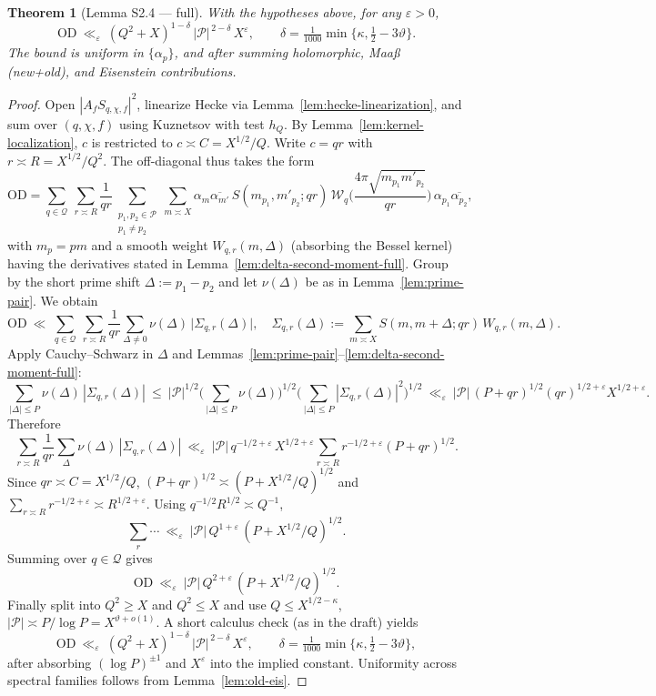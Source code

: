 \documentclass[11pt]{article}
\newtheorem{theorem}[lemma]{Theorem}
\theoremstyle{definition}
\theoremstyle{remark}
\begin{document}
\begin{theorem}[Lemma S2.4 — full]\label{lem:S2.4-full}
	With the hypotheses above, for any $\varepsilon>0$,
	\[
		\mathrm{OD}\ \ll_{\varepsilon}\ (Q^2+X)^{1-\delta}\,|\mathcal P|^{\,2-\delta}\,X^{\varepsilon},
		\qquad
		\delta=\tfrac1{1000}\min\{\kappa,\tfrac12-3\vartheta\}.
	\]
	The bound is uniform in $\{\alpha_p\}$, and after summing holomorphic, Maaß (new+old), and Eisenstein contributions.
\end{theorem}

\begin{proof}
	Open $|A_f S_{q,\chi,f}|^2$, linearize Hecke via Lemma~\ref{lem:hecke-linearization}, and sum over $(q,\chi,f)$ using Kuznetsov with test $h_Q$. By Lemma~\ref{lem:kernel-localization}, $c$ is restricted to $c\asymp C=X^{1/2}/Q$. Write $c=qr$ with $r\asymp R=X^{1/2}/Q^2$. The off-diagonal thus takes the form
	\[
		\mathrm{OD}
		=\sum_{q\in\mathcal Q}\ \sum_{r\asymp R}\frac{1}{qr}
		\sum_{\substack{p_1,p_2\in\mathcal P\\ p_1\ne p_2}}
		\sum_{m\asymp X}\!\alpha_m\overline{\alpha_{m'}}\,
		S(m_{p_1},m'_{p_2};qr)\,
		\mathcal W_q\!\Big(\frac{4\pi\sqrt{m_{p_1}m'_{p_2}}}{qr}\Big)\,\alpha_{p_1}\overline{\alpha_{p_2}},
	\]
	with $m_{p}=pm$ and a smooth weight $W_{q,r}(m,\Delta)$ (absorbing the Bessel kernel) having the derivatives stated in Lemma~\ref{lem:delta-second-moment-full}. Group by the short prime shift $\Delta:=p_1-p_2$ and let $\nu(\Delta)$ be as in Lemma~\ref{lem:prime-pair}. We obtain
	\[
		\mathrm{OD}
		\ \ll\ \sum_{q\in\mathcal Q}\ \sum_{r\asymp R}\frac{1}{qr}\sum_{\Delta\ne 0}\nu(\Delta)\,\big|\Sigma_{q,r}(\Delta)\big|,
		\quad
		\Sigma_{q,r}(\Delta):=\sum_{m\asymp X} S(m,m+\Delta;qr)\,W_{q,r}(m,\Delta).
	\]
	Apply Cauchy–Schwarz in $\Delta$ and Lemmas~\ref{lem:prime-pair}–\ref{lem:delta-second-moment-full}:
	\[
		\sum_{|\Delta|\le P}\nu(\Delta)\,|\Sigma_{q,r}(\Delta)|
		\ \le\ |\mathcal P|^{1/2}\Big(\sum_{|\Delta|\le P}\nu(\Delta)\Big)^{1/2}
		\Big(\sum_{|\Delta|\le P}|\Sigma_{q,r}(\Delta)|^2\Big)^{1/2}
		\ \ll_\varepsilon\ |\mathcal P|\,(P+qr)^{1/2}(qr)^{1/2+\varepsilon}X^{1/2+\varepsilon}.
	\]
	Therefore
	\[
		\sum_{r\asymp R}\frac{1}{qr}\sum_{\Delta}\nu(\Delta)\,|\Sigma_{q,r}(\Delta)|
		\ \ll_\varepsilon\ |\mathcal P|\,q^{-1/2+\varepsilon}\,X^{1/2+\varepsilon}\!
		\sum_{r\asymp R} r^{-1/2+\varepsilon}(P+qr)^{1/2}.
	\]
	Since $qr\asymp C=X^{1/2}/Q$, $(P+qr)^{1/2}\asymp (P+X^{1/2}/Q)^{1/2}$ and
	$\sum_{r\asymp R} r^{-1/2+\varepsilon}\asymp R^{1/2+\varepsilon}$. Using $q^{-1/2}R^{1/2}\asymp Q^{-1}$,
	\[
		\sum_{r}\cdots \ \ll_\varepsilon\ |\mathcal P|\,Q^{1+\varepsilon}\,(P+X^{1/2}/Q)^{1/2}.
	\]
	Summing over $q\in\mathcal Q$ gives
	\[
		\mathrm{OD}\ \ll_\varepsilon\ |\mathcal P|\,Q^{2+\varepsilon}\,(P+X^{1/2}/Q)^{1/2}.
	\]
	Finally split into $Q^2\ge X$ and $Q^2\le X$ and use $Q\le X^{1/2-\kappa}$, $|\mathcal P|\asymp P/\log P=X^{\vartheta+o(1)}$. A short calculus check (as in the draft) yields
	\[
		\mathrm{OD}\ \ll_\varepsilon\ (Q^2+X)^{1-\delta}\,|\mathcal P|^{\,2-\delta}\,X^{\varepsilon},
		\qquad
		\delta=\tfrac1{1000}\min\{\kappa,\tfrac12-3\vartheta\},
	\]
	after absorbing $(\log P)^{\pm1}$ and $X^\varepsilon$ into the implied constant. Uniformity across spectral families follows from Lemma~\ref{lem:old-eis}.
\end{proof}
\end{document}
